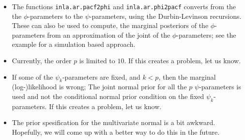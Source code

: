 \documentclass[a4paper,11pt]{article}
\begin{document}
\begin{itemize}
\item The functions \texttt{inla.ar.pacf2phi} and
    \texttt{inla.ar.phi2pacf} converts from the the $\phi$-parameters
    to the $\psi$-parameters, using the Durbin-Levinson
    recursions. These can also be used to compute, the marginal
    posteriors of the $\phi$-parameters from an approximation of the
    joint of the $\phi$-parameters; see the example for a simulation
    based approach.
\item Currently, the order $p$ is limited to $10$. If this creates a
    problem, let us know.
\item If some of the $\psi_{k}$-parameters are fixed, and $k < p$,
    then the marginal (log-)likelihood is wrong; The joint normal
    prior for all the $p$ $\psi$-parameters is used and not the
    conditional normal prior condition on the fixed
    $\psi_{k}$-parameters. If this creates a problem, let us know.
\item The prior spesification for the multivariate normal is a bit
    awkward. Hopefully, we will come up with a better way to do this
    in the future.
\end{itemize}
\end{document}
